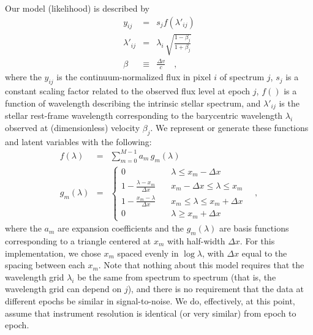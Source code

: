 \documentclass[12pt, letterpaper]{article}
\newcommand{\given}{\,|\,}
\newcommand{\normal}{{\mathcal{N}}}
\begin{document}
Our model (likelihood) is described by
\begin{eqnarray}
   y_{ij} &=& s_j f(\lambda'_{ij})
  \\
  \lambda'_{ij} &=& \lambda_i\,\sqrt{\frac{1 - \beta_j}{1 + \beta_j}}
  \\
  \beta &\equiv& \frac{\Delta v}{c}
  \quad , 
\end{eqnarray}
where the $y_{ij}$ is the continuum-normalized flux in pixel $i$ of
spectrum $j$, $s_j$ is a constant scaling factor related to the observed
flux level at epoch $j$, $f()$ is a function of
wavelength describing the intrinsic stellar spectrum, and
$\lambda'_{ij}$ is the stellar rest-frame wavelength
corresponding to the barycentric wavelength $\lambda_i$ observed at
(dimensionless) velocity $\beta_j$.
We represent or generate these functions and latent variables
with the following:
\begin{eqnarray}
  f(\lambda) &=& \sum_{m=0}^{M-1} a_m\,g_m(\lambda)
  \\
  g_m(\lambda) &=& \left\{
        \begin{array}{ll}
            0 & \quad \lambda \leq x_m -\Delta x \\
            1 - \frac{\lambda - x_m}{\Delta x} & \quad x_m - \Delta x \leq \lambda \leq x_m \\
            1 - \frac{x_m - \lambda}{\Delta x} & \quad x_m \leq \lambda \leq x_m + \Delta x \\
            0 & \quad \lambda \geq x_m + \Delta x
        \end{array}
    \right.
  \quad ,
\end{eqnarray}
where the $a_m$ are expansion coefficients and the $g_m(\lambda)$
are basis functions corresponding to a triangle centered at $x_m$ with half-width 
$\Delta x$. For this implementation, we chose $x_m$ spaced evenly in $\log \lambda$, 
with $\Delta x$ equal to the spacing between each $x_m$.
Note that nothing about this model requires that the wavelength grid
$\lambda_i$ be the same from spectrum to spectrum (that is, the
wavelength grid can depend on $j$), and there is no requirement that
the data at different epochs be similar in signal-to-noise. We do,
effectively, at this point, assume that instrument resolution is
identical (or very similar) from epoch to epoch.
\end{document}
